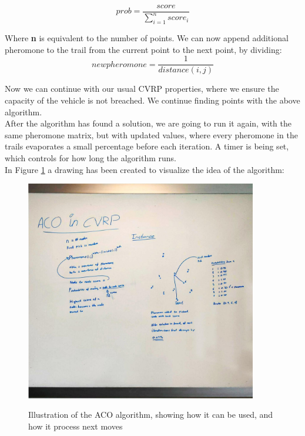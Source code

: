 \documentclass[12pt]{article}
\begin{document}
\begin{equation}
prob = \frac{score}{\displaystyle\sum_{i=1}^{n} score_i}
\end{equation}

Where \textbf{n} is equivalent to the number of points. We can now append additional pheromone to the trail from the current point to the next point, 
by dividing: 
\begin{equation}
    newpheromone = \frac{1}{distance(i, j)}
\end{equation}

Now we can continue with our usual CVRP properties, where we ensure the capacity of the vehicle is not breached. We continue finding points with the above 
algorithm. \\
After the algorithm has found a solution, we are going to run it again, with the same pheromone matrix, but with updated values, where every pheromone in the trails evaporates a small percentage before each iteration. 
 A timer is being set, which controls for how long the algorithm runs. \\
In Figure \ref{fig:acowhiteboard} a drawing has been created to visualize the idea of the algorithm: \\

\begin{figure}[H]
	\caption{Illustration of the ACO algorithm, showing how it can be used, and how it process next moves}
	\centering
	\includegraphics[width=0.9\textwidth]{ACO_Whiteboard.jpg}
	\label{fig:acowhiteboard}

\end{figure}
\end{document}
